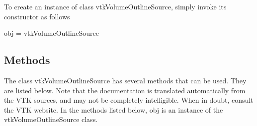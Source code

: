 To create an instance of class vtk\-Volume\-Outline\-Source, simply invoke its constructor as follows \begin{DoxyVerb}  obj = vtkVolumeOutlineSource
\end{DoxyVerb}
 \hypertarget{vtkwidgets_vtkxyplotwidget_Methods}{}\subsection{Methods}\label{vtkwidgets_vtkxyplotwidget_Methods}
The class vtk\-Volume\-Outline\-Source has several methods that can be used. They are listed below. Note that the documentation is translated automatically from the V\-T\-K sources, and may not be completely intelligible. When in doubt, consult the V\-T\-K website. In the methods listed below, {\ttfamily obj} is an instance of the vtk\-Volume\-Outline\-Source class. 
